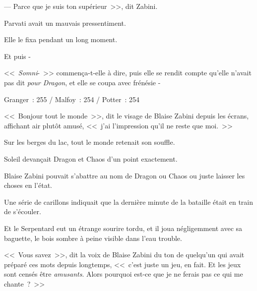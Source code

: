 --- Parce que je suis ton supérieur~>>, dit Zabini.

Parvati avait un mauvais pressentiment.

Elle le fixa pendant un long moment.

Et puis -

<<~\emph{Somni}-~>> commença-t-elle à dire, puis elle se rendit compte qu'elle n'avait pas dit \emph{pour Dragon}, et elle se coupa avec frénésie -

\later

Granger~: 255 / Malfoy~: 254 / Potter~: 254

<<~Bonjour tout le monde~>>, dit le visage de Blaise Zabini depuis les écrans, affichant air plutôt amusé, <<~j'ai l'impression qu'il ne reste que moi.~>>

Sur les berges du lac, tout le monde retenait son souffle.

Soleil devançait Dragon et Chaos d'un point exactement.

Blaise Zabini pouvait s'abattre au nom de Dragon ou Chaos ou juste laisser les choses en l'état.

Une série de carillons indiquait que la dernière minute de la bataille était en train de s'écouler.

Et le Serpentard eut un étrange sourire tordu, et il joua négligemment avec sa baguette, le bois sombre à peine visible dans l'eau trouble.

<<~Vous savez~>>, dit la voix de Blaise Zabini du ton de quelqu'un qui avait préparé ces mots depuis longtemps, <<~c'est juste un jeu, en fait. Et les jeux sont censés être \emph{amusants}. Alors pourquoi est-ce que je ne ferais pas ce qui me chante~?~>>
